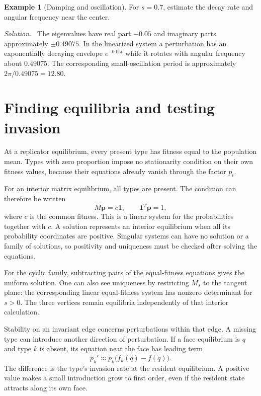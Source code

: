 \documentclass[11pt,oneside,openany]{book}
\theoremstyle{definition}
\newtheorem{example}{Example}[chapter]
\theoremstyle{remark}
\newenvironment{solution}{\par\smallskip\noindent\textit{Solution.}\ }{\par\smallskip}
\newcommand{\p}{\mathbf{p}}
\newcommand{\ones}{\mathbf{1}}
\numberwithin{equation}{chapter}
\begin{document}
\begin{example}[Damping and oscillation]
For $s=0.7$, estimate the decay rate and angular frequency near the center.
\begin{solution}
The eigenvalues have real part $-0.05$ and imaginary parts approximately $\pm0.49075$. In the linearized system a perturbation has an exponentially decaying envelope $e^{-0.05t}$ while it rotates with angular frequency about $0.49075$. The corresponding small-oscillation period is approximately $2\pi/0.49075=12.80$.
\end{solution}
\end{example}

\section{Finding equilibria and testing invasion}
At a replicator equilibrium, every present type has fitness equal to the population mean. Types with zero proportion impose no stationarity condition on their own fitness values, because their equations already vanish through the factor $p_i$.

For an interior matrix equilibrium, all types are present. The condition can therefore be written
\[
M\p=c\ones,\qquad\ones^T\p=1,
\]
where $c$ is the common fitness. This is a linear system for the probabilities together with $c$. A solution represents an interior equilibrium when all its probability coordinates are positive. Singular systems can have no solution or a family of solutions, so positivity and uniqueness must be checked after solving the equations.

For the cyclic family, subtracting pairs of the equal-fitness equations gives the uniform solution. One can also see uniqueness by restricting $M_s$ to the tangent plane: the corresponding linear equal-fitness system has nonzero determinant for $s>0$. The three vertices remain equilibria independently of that interior calculation.

Stability on an invariant edge concerns perturbations within that edge. A missing type can introduce another direction of perturbation. If a face equilibrium is $q$ and type $k$ is absent, its equation near the face has leading term
\[
p_k'\approx p_k\bigl(f_k(q)-\bar f(q)\bigr).
\]
The difference is the type's invasion rate at the resident equilibrium. A positive value makes a small introduction grow to first order, even if the resident state attracts along its own face.
\end{document}
